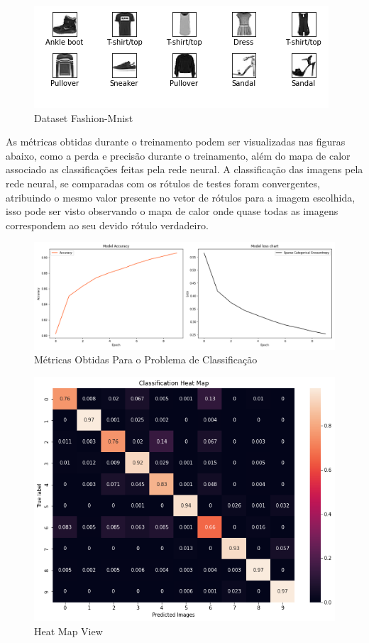 \documentclass[12pt,openright,openany,oneside,article,a4paper,brazi]{abntex2}
\begin{document}
\begin{figure}[!htb]
  \centering
  \includegraphics[scale=0.77]{Dataset.PNG}
  \caption{Dataset Fashion-Mnist}
  \label{fig:}
\end{figure}

As métricas obtidas durante o treinamento podem ser visualizadas nas figuras abaixo, como a perda e precisão durante o treinamento, além do mapa de calor associado as classificações feitas pela rede neural. A classificação das 
imagens pela rede neural, se comparadas com os rótulos de testes foram convergentes, atribuindo o mesmo valor presente no vetor de rótulos para a imagem escolhida, isso pode ser visto observando o mapa de calor onde quase todas
as imagens correspondem ao seu devido rótulo verdadeiro.

\begin{figure}[!htb]
  \centering
  \includegraphics[scale=0.6]{metrics_Classification.PNG}
  \caption{Métricas Obtidas Para o Problema de Classificação}
  \label{fig:}
\end{figure}
\begin{figure}[!htb]
  \centering
  \includegraphics[scale=0.44]{download.png}
  \caption{Heat Map View}
  \label{fig:}
\end{figure}
\end{document}
